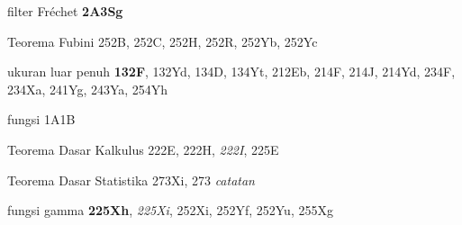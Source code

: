filter Fr\'echet {\bf 2A3Sg}





































Teorema Fubini 252B, 252C, 252H, 252R, 252Yb, 252Yc








ukuran luar penuh {\bf 132F}, 132Yd, 134D, 134Yt,
  212Eb, 214F, 214J, 214Yd, 234F, 234Xa, 241Yg, 243Ya, 254Yh














fungsi 1A1B



Teorema Dasar Kalkulus 222E, 222H, {\it 222I}, 225E


Teorema Dasar Statistika 273Xi, 273 {\it catatan}



\indexmedskip
















fungsi gamma {\bf 225Xh}, {\it 225Xi}, 252Xi, 252Yf, 252Yu,
255Xg









